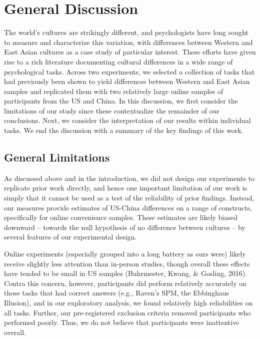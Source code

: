 \documentclass[
  man,floatsintext]{apa6}
\begin{document}
\hypertarget{general-discussion}{%
\section{General Discussion}\label{general-discussion}}

The world's cultures are strikingly different, and psychologists have long sought to measure and characterize this variation, with differences between Western and East Asian cultures as a case study of particular interest. These efforts have given rise to a rich literature documenting cultural differences in a wide range of psychological tasks. Across two experiments, we selected a collection of tasks that had previously been shown to yield differences between Western and East Asian samples and replicated them with two relatively large online samples of participants from the US and China. In this discussion, we first consider the limitations of our study since these contextualize the remainder of our conclusions. Next, we consider the interpretation of our results within individual tasks. We end the discussion with a summary of the key findings of this work.

\hypertarget{general-limitations}{%
\subsection{General Limitations}\label{general-limitations}}

As discussed above and in the introduction, we did not design our experiments to replicate prior work directly, and hence one important limitation of our work is simply that it cannot be used as a test of the reliability of prior findings. Instead, our measures provide estimates of US-China differences on a range of constructs, specifically for online convenience samples. These estimates are likely biased downward -- towards the null hypothesis of no difference between cultures -- by several features of our experimental design.

Online experiments (especially grouped into a long battery as ours were) likely receive slightly less attention than in-person studies, though overall these effects have tended to be small in US samples (Buhrmester, Kwang, \& Gosling, 2016). Contra this concern, however, participants did perform relatively accurately on those tasks that had correct answers (e.g., Raven's SPM, the Ebbinghaus Illusion), and in our exploratory analysis, we found relatively high reliabilities on all tasks. Further, our pre-registered exclusion criteria removed participants who performed poorly. Thus, we do not believe that participants were inattentive overall.
\end{document}
